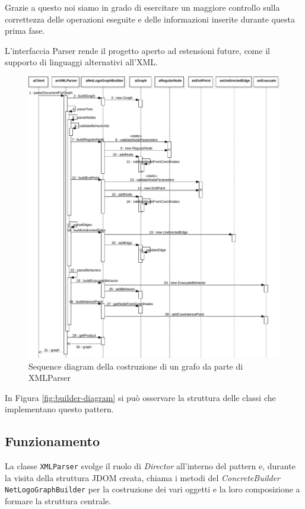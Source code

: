 Grazie a questo noi siamo in grado di esercitare un maggiore controllo sulla correttezza delle operazioni eseguite e delle informazioni inserite durante questa prima fase.

L'interfaccia Parser rende il progetto aperto ad estensioni future, come il supporto di linguaggi alternativi all'XML.

\begin{figure}[htbp]
\centering
\includegraphics[width=\textwidth,height=\textheight,keepaspectratio]{images/builder-sequence.pdf}
\caption{Sequence diagram della costruzione di un grafo da parte di XMLParser}
\label{fig:builder-sequence}
\end{figure}

In Figura \ref{fig:builder-diagram} si può osservare la struttura delle classi che implementano questo pattern.

\subsection{Funzionamento}
La classe \texttt{XMLParser} svolge il ruolo di \textit{Director} all'interno del pattern e, durante la visita della struttura JDOM \cite{jdom} creata, chiama i metodi del \textit{ConcreteBuilder} \texttt{NetLogoGraphBuilder} per la costruzione dei vari oggetti e la loro composizione a formare la struttura centrale.

